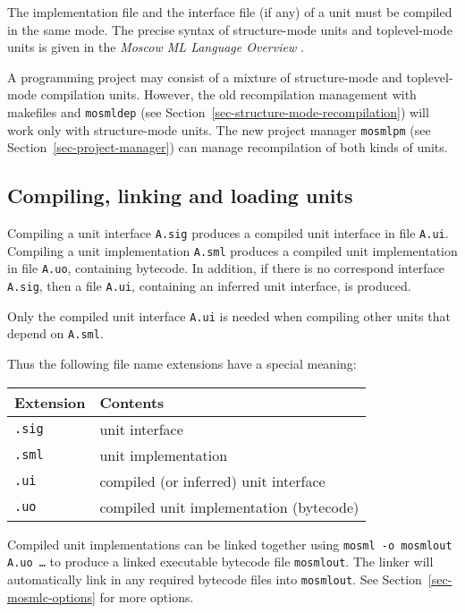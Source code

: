 \documentclass[fleqn,a4paper]{article}
\begin{document}
\noindent 
The implementation file and the interface file (if any) of a unit must
be compiled in the same mode.  The precise syntax of structure-mode
units and toplevel-mode units is given in the \emph{Moscow ML Language
  Overview} \cite{MoscowML:2000:MoscowMLLanguage}.

A programming project may consist of a mixture of structure-mode and
toplevel-mode compilation units.  However, the old recompilation
management with makefiles and \texttt{mosmldep} (see
Section~\ref{sec-structure-mode-recompilation}) will work only with
structure-mode units.  The new project manager \texttt{mosmlpm} (see
Section~\ref{sec-project-manager}) can manage recompilation of
both kinds of units.
 

\subsection{Compiling, linking and loading units}

Compiling a unit interface \texttt{A.sig} produces a compiled unit
interface in file \texttt{A.ui}\@.  Compiling a unit implementation
\texttt{A.sml} produces a compiled unit implementation in file
\texttt{A.uo}, containing bytecode.  In addition, if there is no
correspond interface \texttt{A.sig}, then a file \texttt{A.ui},
containing an inferred unit interface, is produced.

Only the compiled unit interface \texttt{A.ui} is needed when
compiling other units that depend on \texttt{A.sml}.

Thus the following file name extensions have a special meaning: 

\begin{center}
\begin{tabular}{|l|l|}\hline
Extension & Contents\\\hline
\texttt{.sig} & unit interface\\
\texttt{.sml} & unit implementation\\
\texttt{.ui}  & compiled (or inferred) unit interface\\
\texttt{.uo}  & compiled unit implementation (bytecode)\\\hline
\end{tabular}
\end{center}

\noindent 
Compiled unit implementations can be linked together using {\tt mosml
  -o mosmlout A.uo \ldots} to produce a linked executable bytecode
file {\tt mosmlout}.  The linker will automatically link in any
required bytecode files into {\tt mosmlout}.  See
Section~\ref{sec-mosmlc-options} for more options.
\end{document}
